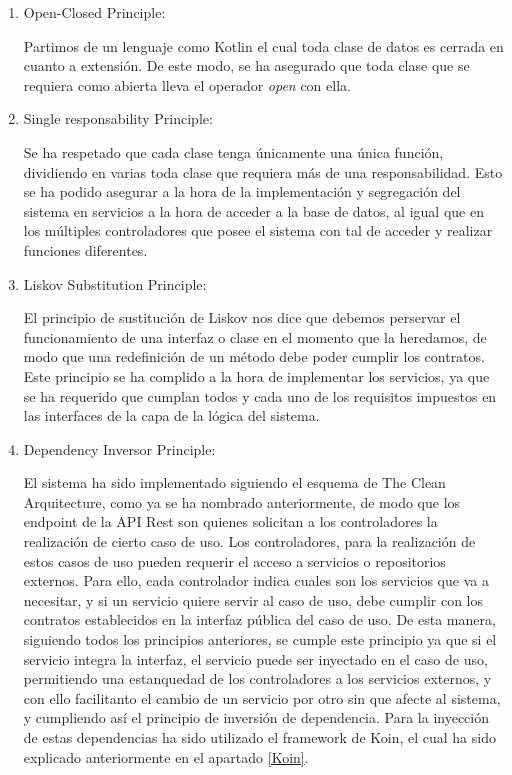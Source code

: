         \begin{enumerate}
            \item Open-Closed Principle:
            
            Partimos de un lenguaje como Kotlin el cual toda clase de datos es cerrada en cuanto a extensión. De este modo, se ha asegurado que toda clase que se requiera como abierta lleva el operador \textit{open} con ella.
            
            \item Single responsability Principle:
            
            Se ha respetado que cada clase tenga únicamente una única función, dividiendo en varias toda clase que requiera más de una responsabilidad. Esto se ha podido asegurar a la hora de la implementación y segregación del sistema en servicios a la hora de acceder a la base de datos, al igual que en los múltiples controladores que posee el sistema con tal de acceder y realizar funciones diferentes.
            
            \item Liskov Substitution Principle:
            
            El principio de sustitución de Liskov nos dice que debemos perservar el funcionamiento de una interfaz o clase en el momento que la heredamos, de modo que una redefinición de un método debe poder cumplir los contratos. Este principio se ha complido a la hora de implementar los servicios, ya que se ha requerido que cumplan todos y cada uno de los requisitos impuestos en las interfaces de la capa de la lógica del sistema.
            
            \item Dependency Inversor Principle:
            
            El sistema ha sido implementado siguiendo el esquema de The Clean Arquitecture, como ya se ha nombrado anteriormente, de modo que los endpoint de la API Rest son quienes solicitan a los controladores la realización de cierto caso de uso.
            Los controladores, para la realización de estos casos de uso pueden requerir el acceso a servicios o repositorios externos. Para ello, cada controlador indica cuales son los servicios que va a necesitar, y si un servicio quiere servir al caso de uso, debe cumplir con los contratos establecidos en la interfaz pública del caso de uso.
            De esta manera, siguiendo todos los principios anteriores, se cumple este principio ya que si el servicio integra la interfaz, el servicio puede ser inyectado en el caso de uso, permitiendo una estanquedad de los controladores a los servicios externos, y con ello facilitanto el cambio de un servicio por otro sin que afecte al sistema, y cumpliendo así el principio de inversión de dependencia.
            Para la inyección de estas dependencias ha sido utilizado el framework de Koin, el cual ha sido explicado anteriormente en el apartado \ref{Koin}.
            

\end{enumerate}
